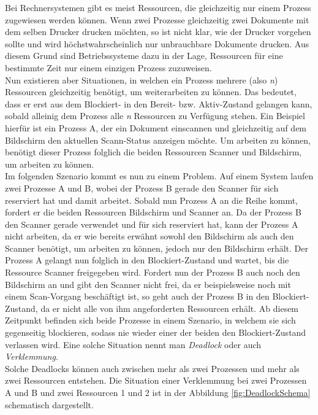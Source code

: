 				Bei Rechnersystemen gibt es meist Ressourcen, die gleichzeitig nur einem Prozess zugewiesen werden können. Wenn zwei Prozesse gleichzeitig zwei Dokumente mit dem selben Drucker drucken möchten, so ist nicht klar, wie der Drucker vorgehen sollte und wird höchstwahrscheinlich nur unbrauchbare Dokumente drucken. Aus diesem Grund sind Betriebssysteme dazu in der Lage, Ressourcen für eine bestimmte Zeit nur einem einzigen Prozess zuzuweisen.\\
				Nun existieren aber Situationen, in welchen ein Prozess mehrere (also \textit{n}) Ressourcen gleichzeitig benötigt, um weiterarbeiten zu können. Das bedeutet, dass er erst aus dem Blockiert- in den Bereit- bzw. Aktiv-Zustand gelangen kann, sobald alleinig dem Prozess alle \textit{n} Ressourcen zu Verfügung stehen. Ein Beispiel hierfür ist ein Prozess A, der ein Dokument einscannen und gleichzeitig auf dem Bildschirm den aktuellen Scann-Status anzeigen möchte. Um arbeiten zu können, benötigt dieser Prozess folglich die beiden Ressourcen Scanner und Bildschirm, um arbeiten zu können.\\
				Im folgenden Szenario kommt es nun zu einem Problem. Auf einem System laufen zwei Prozesse A und B, wobei der Prozess B gerade den Scanner für sich reserviert hat und damit arbeitet. Sobald nun Prozess A an die Reihe kommt, fordert er die beiden Ressourcen Bildschirm und Scanner an. Da der Prozess B den Scanner gerade verwendet und für sich reserviert hat, kann der Prozess A nicht arbeiten, da er wie bereits erwähnt sowohl den Bildschirm als auch den Scanner benötigt, um arbeiten zu können, jedoch nur den Bildschirm erhält. Der Prozess A gelangt nun folglich in den Blockiert-Zustand und wartet, bis die Ressource Scanner freigegeben wird. Fordert nun der Prozess B auch noch den Bildschirm an und gibt den Scanner nicht frei, da er beispielsweise noch mit einem Scan-Vorgang beschäftigt ist, so geht auch der Prozess B in den Blockiert-Zustand, da er nicht alle von ihm angeforderten Ressourcen erhält. Ab diesem Zeitpunkt befinden sich beide Prozesse in einem Szenario, in welchem sie sich gegenseitig blockieren, sodass nie wieder einer der beiden den Blockiert-Zustand verlassen wird. Eine solche Situation nennt man \textit{Deadlock} oder auch \textit{Verklemmung}. \cite{DeadlockWikipedia}\\
				Solche Deadlocks können auch zwischen mehr als zwei Prozessen und mehr als zwei Ressourcen entstehen. Die Situation einer Verklemmung bei zwei Prozessen A und B und zwei Ressourcen 1 und 2 ist in der Abbildung \ref{fig:DeadlockSchema} schematisch dargestellt.
				

